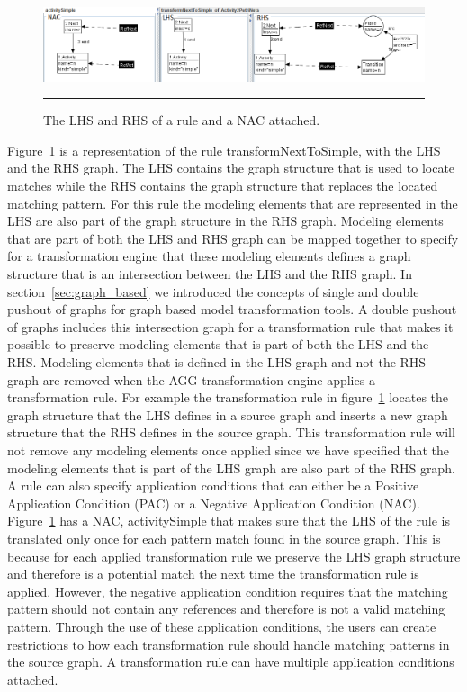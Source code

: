 \begin{figure}[H]
	\centering
	\includegraphics[scale=0.5]{figures/LHSvsRHSAGG.png}
	\rule{35em}{0.5pt}
	\caption[Representation of a rule in AGG]
	{The LHS and RHS of a rule and a NAC attached.}
	\label{fig:LHSvsRHSAGG}
\end{figure}

Figure~\ref{fig:LHSvsRHSAGG} is a representation of the rule
transformNextToSimple, with the LHS and the RHS graph. The LHS contains the
graph structure that is used to locate matches while the RHS contains the
graph structure that replaces the located matching pattern. For this rule the
modeling elements that are represented in the LHS are also part of the graph
structure in the RHS graph. Modeling elements that are part of both the LHS and
RHS graph can be mapped together to specify for a transformation engine that
these modeling elements defines a graph structure that is an intersection
between the LHS and the RHS graph. In section~\ref{sec:graph_based} we
introduced the concepts of single and double pushout of graphs for graph based
model transformation tools. A double pushout of graphs includes this
intersection graph for a transformation rule that makes it possible to preserve
modeling elements that is part of both the LHS and the RHS. Modeling elements
that is defined in the LHS graph and not the RHS graph are removed when the AGG
transformation engine applies a transformation rule. For example the
transformation rule in figure~\ref{fig:LHSvsRHSAGG} locates the graph structure
that the LHS defines in a source graph and inserts a new graph structure that
the RHS defines in the source graph. This transformation rule will not remove
any modeling elements once applied since we have specified that the modeling
elements that is part of the LHS graph are also part of the RHS graph. A rule
can also specify application conditions that can either be a Positive
Application Condition (PAC) or a Negative Application Condition (NAC).
Figure~\ref{fig:LHSvsRHSAGG} has a NAC, activitySimple that makes sure that the
LHS of the rule is translated only once for each pattern match found in the
source graph. This is because for each applied transformation rule we preserve
the LHS graph structure and therefore is a potential match the next time the
transformation rule is applied. However, the negative application condition
requires that the matching pattern should not contain any references and
therefore is not a valid matching pattern. Through the use of these application
conditions, the users can create restrictions to how each transformation rule
should handle matching patterns in the source graph. A transformation rule
can have multiple application conditions attached.

